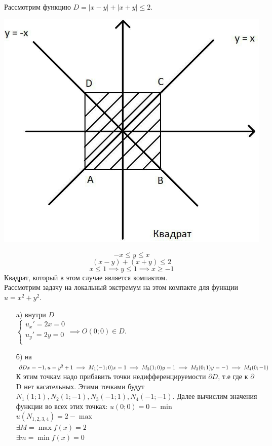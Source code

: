 \documentclass[../../main.tex]{subfiles}
\begin{document}
	\begin{exmp}
		Рассмотрим функцию $D = |x - y| + |x + y| \leq 2$.
		\begin{center}
			\includegraphics[scale = 0.7]{square.jpg}
		\end{center}
		\[-x \leq y \leq x \]
		\[(x - y) + (x + y) \leq 2\]
		\[ x \leq 1 \implies y \leq 1  \implies x \geq -1\]
		Квадрат, который в этом случае является компактом.\\
		Рассмотрим задачу на локальный экстремум на этом 
		компакте для функции $u = x^2 + y^2$. 
		\begin{enumerate}
			\item[a)] внутри $D$\\
			$\begin{cases}
				u_{x}' = 2x = 0\\
				u_{y}' = 2y = 0\\
			\end{cases} \implies O(0; 0) \in D$.\\
			
			\item[б)] на $\partial D \\
			x = -1, u = y^2 + 1 \implies M_1(-1; 0)\\
			x = 1 \implies M_2(1; 0)\\
			y = 1 \implies M_3(0; 1)\\
			y = -1 \implies M_4(0; -1)$\\
			К этим точкам надо прибавить точки 
			недифференцируемости $\partial D$, т.е где к $
			\partial$ D нет касательных. 
			Этими точками будут $N_1(1; 1), N_2(1; -1), 
			N_3(-1; 1), N_4(-1; -1)$.
			Далее вычислим значения функции во всех этих 
			точках:
			$u(0; 0) = 0 - \min$\\
			$u(N_{1, 2, 3, 4}) = 2 - \max$\\
			$\exists M = \max f(x) = 2$\\
			$\exists m = \min f(x) = 0$
		\end{enumerate}
	\end{exmp}
	
	
\end{document}
